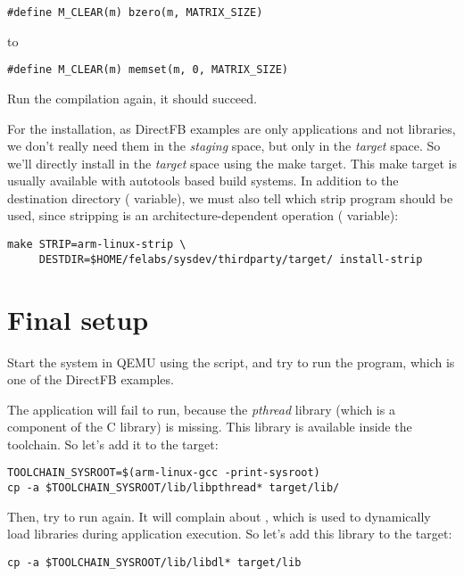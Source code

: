 \begin{verbatim}
#define M_CLEAR(m) bzero(m, MATRIX_SIZE)
\end{verbatim}

to

\begin{verbatim}
#define M_CLEAR(m) memset(m, 0, MATRIX_SIZE)
\end{verbatim}

Run the compilation again, it should succeed.

For the installation, as DirectFB examples are only applications and
not libraries, we don't really need them in the {\em staging} space,
but only in the {\em target} space. So we'll directly install in the
{\em target} space using the  make target. This
make target is usually available with autotools based build
systems. In addition to the destination directory (
variable), we must also tell which strip program should be used, since
stripping is an architecture-dependent operation (
variable):

\begin{verbatim}
make STRIP=arm-linux-strip \
     DESTDIR=$HOME/felabs/sysdev/thirdparty/target/ install-strip
\end{verbatim}

\section{Final setup}

Start the system in QEMU using the  script, and try to
run the \code{df_andi} program, which is one of the DirectFB examples.

The application will fail to run, because the {\em pthread} library
(which is a component of the C library) is missing. This library is
available inside the toolchain. So let's add it to the target:

\begin{verbatim}
TOOLCHAIN_SYSROOT=$(arm-linux-gcc -print-sysroot)
cp -a $TOOLCHAIN_SYSROOT/lib/libpthread* target/lib/
\end{verbatim}

Then, try to run  again. It will complain about
, which is used to dynamically load libraries during
application execution. So let's add this library to the target:

\begin{verbatim}
cp -a $TOOLCHAIN_SYSROOT/lib/libdl* target/lib
\end{verbatim}

